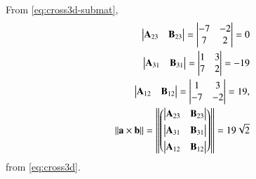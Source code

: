   From \eqref{eq:cross3d-submat},
\begin{align}
	\mydet{\vec{A}_{23}&\vec{B}_{23}}=\mydet{-7 & -2 \\ 7 & 2}=0\\
	\mydet{\vec{A}_{31}&\vec{B}_{31}}=\mydet{1 & 3 \\ 7 & 2}=-19\\
	\mydet{\vec{A}_{12}&\vec{B}_{12}}=\mydet{1 & 3 \\ -7 & -2}=19,
	\\
	\norm{\vec{a}\times\vec{b}}
	 = \norm{\myvec{ \mydet{\vec{A}_{23} & \vec{B}_{23}} \\[1ex] \mydet{\vec{A}_{31} & \vec{B}_{31}} \\[1ex] \mydet{\vec{A}_{12}  & \vec{B}_{12}}}}
=19\sqrt{2}
\end{align}
from 
  \eqref{eq:cross3d}.
